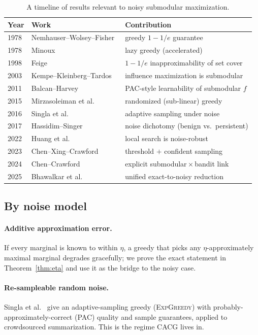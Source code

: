 \documentclass[11pt]{article}
\theoremstyle{plain}
\theoremstyle{definition}
\begin{document}
\begin{table}[H]
\centering\small
\caption{A timeline of results relevant to noisy submodular maximization.}
\label{tab:timeline}
\begin{tabular}{lll}
\toprule
Year & Work & Contribution\\
\midrule
1978 & Nemhauser--Wolsey--Fisher~\cite{NWF1978} & greedy $1-1/e$ guarantee\\
1978 & Minoux~\cite{Minoux1978} & lazy greedy (accelerated)\\
1998 & Feige~\cite{Feige1998} & $1-1/e$ inapproximability of set cover\\
2003 & Kempe--Kleinberg--Tardos~\cite{KKT2003} & influence maximization is submodular\\
2011 & Balcan--Harvey~\cite{BalcanHarvey2011} & PAC-style learnability of submodular $f$\\
2015 & Mirzasoleiman et al.~\cite{Mirzasoleiman2015} & randomized (sub-linear) greedy\\
2016 & Singla et al.~\cite{Singla2016} & adaptive sampling under noise\\
2017 & Hassidim--Singer~\cite{HassidimSinger2017} & noise dichotomy (benign vs.\ persistent)\\
2022 & Huang et al.~\cite{Huang2022} & local search is noise-robust\\
2023 & Chen--Xing--Crawford~\cite{ChenXingCrawford2023} & threshold $+$ confident sampling\\
2024 & Chen--Crawford~\cite{ChenCrawford2024} & explicit submodular\,$\times$\,bandit link\\
2025 & Bhawalkar et al.~\cite{Bhawalkar2025} & unified exact-to-noisy reduction\\
\bottomrule
\end{tabular}
\end{table}

\subsection{By noise model}
\paragraph{Additive approximation error.}
If every marginal is known to within $\eta$, a greedy that picks any
$\eta$-approximately maximal marginal degrades gracefully; we prove the
exact statement in Theorem~\ref{thm:eta} and use it as the bridge to the
noisy case.

\paragraph{Re-sampleable random noise.}
Singla et al.~\cite{Singla2016} give an adaptive-sampling greedy
(\textsc{ExpGreedy}) with probably-approximately-correct (PAC) quality and
sample guarantees, applied to crowdsourced summarization. This is the
regime CACG lives in.
\end{document}
